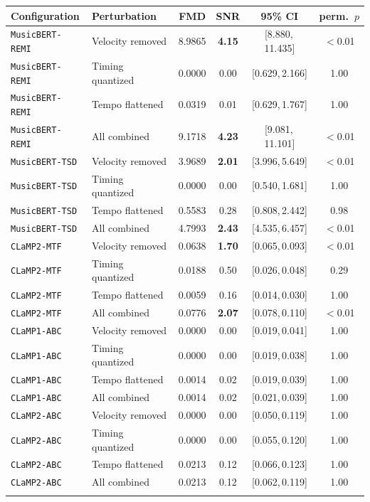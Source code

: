 \begin{tabular}{@{}llcccc@{}}
\toprule
Configuration & Perturbation & FMD & SNR & 95\% CI & perm.\ $p$ \\
\midrule
\texttt{MusicBERT-REMI} & Velocity removed & 8.9865 & \textbf{4.15} & [8.880,\,11.435] & $<$0.01 \\
\texttt{MusicBERT-REMI} & Timing quantized & 0.0000 & {0.00} & [0.629,\,2.166] & 1.00 \\
\texttt{MusicBERT-REMI} & Tempo flattened & 0.0319 & {0.01} & [0.629,\,1.767] & 1.00 \\
\texttt{MusicBERT-REMI} & All combined & 9.1718 & \textbf{4.23} & [9.081,\,11.101] & $<$0.01 \\
\addlinespace
\texttt{MusicBERT-TSD} & Velocity removed & 3.9689 & \textbf{2.01} & [3.996,\,5.649] & $<$0.01 \\
\texttt{MusicBERT-TSD} & Timing quantized & 0.0000 & {0.00} & [0.540,\,1.681] & 1.00 \\
\texttt{MusicBERT-TSD} & Tempo flattened & 0.5583 & {0.28} & [0.808,\,2.442] & 0.98 \\
\texttt{MusicBERT-TSD} & All combined & 4.7993 & \textbf{2.43} & [4.535,\,6.457] & $<$0.01 \\
\addlinespace
\texttt{CLaMP2-MTF} & Velocity removed & 0.0638 & \textbf{1.70} & [0.065,\,0.093] & $<$0.01 \\
\texttt{CLaMP2-MTF} & Timing quantized & 0.0188 & {0.50} & [0.026,\,0.048] & 0.29 \\
\texttt{CLaMP2-MTF} & Tempo flattened & 0.0059 & {0.16} & [0.014,\,0.030] & 1.00 \\
\texttt{CLaMP2-MTF} & All combined & 0.0776 & \textbf{2.07} & [0.078,\,0.110] & $<$0.01 \\
\addlinespace
\texttt{CLaMP1-ABC} & Velocity removed & 0.0000 & {0.00} & [0.019,\,0.041] & 1.00 \\
\texttt{CLaMP1-ABC} & Timing quantized & 0.0000 & {0.00} & [0.019,\,0.038] & 1.00 \\
\texttt{CLaMP1-ABC} & Tempo flattened & 0.0014 & {0.02} & [0.019,\,0.039] & 1.00 \\
\texttt{CLaMP1-ABC} & All combined & 0.0014 & {0.02} & [0.021,\,0.039] & 1.00 \\
\addlinespace
\texttt{CLaMP2-ABC} & Velocity removed & 0.0000 & {0.00} & [0.050,\,0.119] & 1.00 \\
\texttt{CLaMP2-ABC} & Timing quantized & 0.0000 & {0.00} & [0.055,\,0.120] & 1.00 \\
\texttt{CLaMP2-ABC} & Tempo flattened & 0.0213 & {0.12} & [0.066,\,0.123] & 1.00 \\
\texttt{CLaMP2-ABC} & All combined & 0.0213 & {0.12} & [0.062,\,0.119] & 1.00 \\
\addlinespace
\bottomrule
\end{tabular}